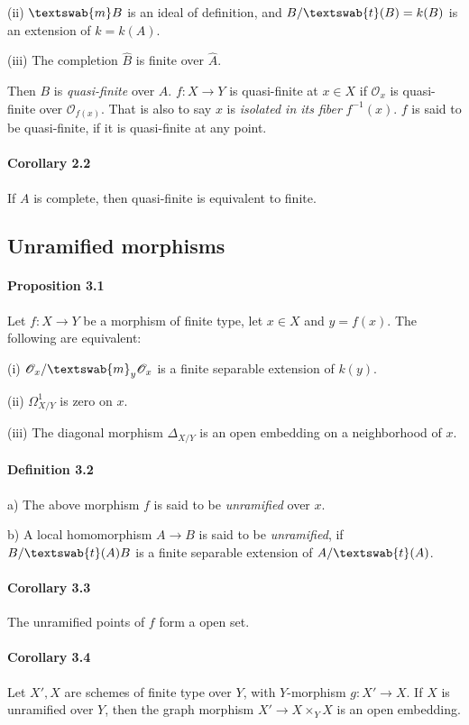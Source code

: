 \documentclass[11pt]{article}
\begin{document}
(ii) $\textswab{m}B$ is an ideal of definition, and $B/\textswab{t}(B)=k(B)$ is an extension of $k=k(A)$.

(iii) The completion $\hat{B}$ is finite over $\hat{A}$.

Then $B$ is \textit{quasi-finite} over $A$. $f:X\to Y$ is quasi-finite at $x\in X$ if $\mathscr{O}_x$ is quasi-finite over $\mathscr{O}_{f(x)}$. That is also to say $x$ is \textit{isolated in its fiber} $f^{-1}(x)$. $f$ is said to be quasi-finite, if it is quasi-finite at any point.

\paragraph{Corollary 2.2} If $A$ is complete, then quasi-finite is equivalent to finite.

\subsection{Unramified morphisms}
\paragraph{Proposition 3.1} Let $f:X\to Y$ be a morphism of finite type, let $x\in X$ and $y=f(x)$. The following are equivalent:

(i) $\mathscr{O}_x/\textswab{m}_y\mathscr{O}_x$ is a finite separable extension of $k(y)$.

(ii) $\Omega^1_{X/Y}$ is zero on $x$.

(iii) The diagonal morphism $\Delta_{X/Y}$ is an open embedding on a neighborhood of $x$.

\paragraph{Definition 3.2} a) The above morphism $f$ is said to be \textit{unramified} over $x$.

b) A local homomorphism $A\to B$ is said to be \textit{unramified}, if $B/\textswab{t}(A)B$ is a finite separable extension of $A/\textswab{t}(A)$.

\paragraph{Corollary 3.3} The unramified points of $f$ form a open set.

\paragraph{Corollary 3.4} Let $X',X$ are schemes of finite type over $Y$, with $Y$-morphism $g:X'\to X$. If $X$ is unramified over $Y$, then the graph morphism $X'\to X\times_Y X$ is an open embedding.
\end{document}
